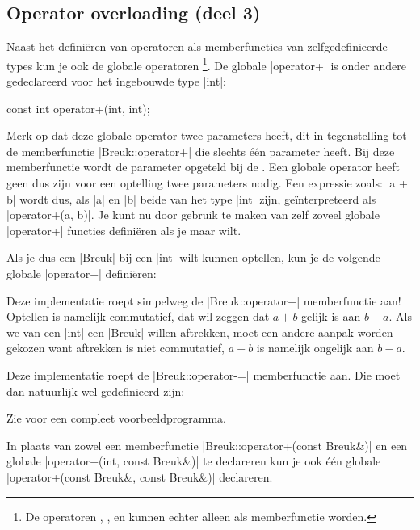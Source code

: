 \begin{cpplstShortInline}
\section{Operator overloading (deel 3)}
\label{sec:globaloperator}
Naast het definiëren van operatoren als memberfuncties van zelfgedefinieerde types kun je ook de globale operatoren %
\footnote{%
	De operatoren \cppcode{=}, \cppcode{[]}, \cppcode{()} en \cppcode{->} kunnen echter alleen als memberfunctie  worden.
}. 
De globale |operator+| is onder andere gedeclareerd voor het ingebouwde type |int|:
\begin{cpplstfragment}
	const int operator+(int, int);
\end{cpplstfragment}

Merk op dat deze globale operator twee parameters heeft, dit in tegenstelling tot de memberfunctie |Breuk::operator+| die slechts één parameter heeft. 
Bij deze memberfunctie wordt de parameter opgeteld bij de . 
Een globale operator heeft geen  dus zijn voor een optelling twee parameters nodig. 
Een expressie zoals: |a + b| wordt dus, als |a| en |b| beide van het type |int| zijn, geïnterpreteerd als |operator+(a, b)|. 
Je kunt nu door gebruik te maken van  zelf zoveel globale |operator+| functies definiëren als je maar wilt.

Als je dus een |Breuk| bij een |int| wilt kunnen optellen, kun je de volgende globale |operator+| definiëren:

Deze implementatie roept simpelweg de |Breuk::operator+| memberfunctie aan! Optellen is namelijk commutatief, dat wil zeggen dat $a + b$ gelijk is aan $b + a$. Als we van een |int| een |Breuk| willen aftrekken, moet een andere aanpak worden gekozen want aftrekken is niet commutatief, $a - b$ is namelijk ongelijk aan $b - a$.

Deze implementatie roept de |Breuk::operator-=| memberfunctie aan. Die moet dan natuurlijk wel gedefinieerd zijn:

Zie  voor een compleet voorbeeldprogramma.

In plaats van zowel een memberfunctie |Breuk::operator+(const Breuk&)| en een globale |operator+(int, const Breuk&)| te declareren kun je ook één globale |operator+(const Breuk&, const Breuk&)| declareren.


\end{cpplstShortInline}
